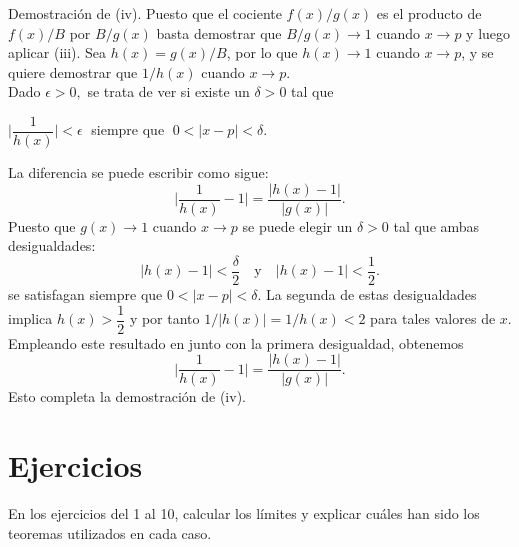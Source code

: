 Demostración de (iv). Puesto que el cociente $f(x)/g(x)$ es el producto de $f(x)/B$ por $B/g(x)$ basta demostrar que $B/g(x)\to 1$ cuando $x\to p$ y luego aplicar (iii). Sea $h(x)=g(x)/B$, por lo que $h(x)\to 1$ cuando $x\to p$, y se quiere demostrar que $1/h(x)$ cuando $x\to p$.\\
Dado $\epsilon>0,$ se trata de ver si existe un $\delta>0$ tal que
\begin{center}
$\bigg|\dfrac{1}{h(x)}\bigg|<\epsilon\;$ siempre que $\; 0<|x-p|<\delta.$
\end{center}
La diferencia se puede escribir como sigue:
$$\bigg|\dfrac{1}{h(x)}-1\bigg|=\dfrac{|h(x)-1|}{|g(x)|}.$$
Puesto que $g(x)\to 1$ cuando $x\to p$ se puede elegir un $\delta>0$ tal que ambas desigualdades:
$$|h(x)-1|<\dfrac{\delta}{2}\quad \mbox{y}\quad |h(x)-1|<\dfrac{1}{2}.$$
se satisfagan siempre que $0<|x-p|<\delta$. La segunda de estas desigualdades implica $h(x)>\dfrac{1}{2}$ y por tanto $1/|h(x)|=1/h(x)<2$ para tales valores de $x$. Empleando este resultado en junto con la primera desigualdad, obtenemos 
$$\bigg|\dfrac{1}{h(x)}-1\bigg|=\dfrac{|h(x)-1|}{|g(x)|}.$$
Esto completa la demostración de (iv).\\

\section{Ejercicios}

En los ejercicios del 1 al 10, calcular los límites y explicar cuáles han sido los teoremas utilizados en cada caso.\\\\

